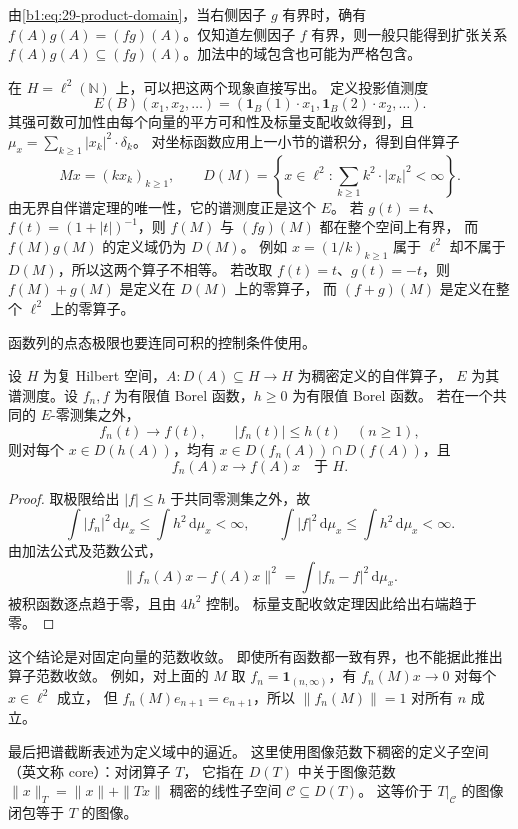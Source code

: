 由\eqref{b1:eq:29-product-domain}，当右侧因子 \(g\) 有界时，确有
\(f(A)g(A)=(fg)(A)\)。仅知道左侧因子 \(f\) 有界，则一般只能得到扩张关系
\(f(A)g(A)\subseteq(fg)(A)\)。加法中的域包含也可能为严格包含。

在 \(H=\ell^2(\mathbb N)\) 上，可以把这两个现象直接写出。
定义投影值测度
\[
 E(B)(x_1,x_2,\ldots)
 =(\mathbf1_B(1)\cdot x_1,\mathbf1_B(2)\cdot x_2,\ldots).
\]
其强可数可加性由每个向量的平方可和性及标量支配收敛得到，且
\(\mu_x=\sum_{k\ge1}|x_k|^2\cdot\delta_k\)。
对坐标函数应用上一小节的谱积分，得到自伴算子
\[
 Mx=(kx_k)_{k\ge1},\qquad
 D(M)=\left\{x\in\ell^2:\sum_{k\ge1}k^2\cdot|x_k|^2<\infty\right\}.
\]
由无界自伴谱定理的唯一性，它的谱测度正是这个 \(E\)。
若 \(g(t)=t\)、\(f(t)=(1+|t|)^{-1}\)，则 \(f(M)\) 与 \((fg)(M)\) 都在整个空间上有界，
而 \(f(M)g(M)\) 的定义域仍为 \(D(M)\)。
例如 \(x=(1/k)_{k\ge1}\) 属于 \(\ell^2\) 却不属于 \(D(M)\)，所以这两个算子不相等。
若改取 \(f(t)=t\)、\(g(t)=-t\)，则 \(f(M)+g(M)\) 是定义在 \(D(M)\) 上的零算子，
而 \((f+g)(M)\) 是定义在整个 \(\ell^2\) 上的零算子。

\ProseParagraphBreak

函数列的点态极限也要连同可积的控制条件使用。

\begin{proposition}[谱积分的支配收敛]
\label{b1:prop:29-unbounded-calculus-dominated}
设 \(H\) 为复 Hilbert 空间，\(A:D(A)\subseteq H\to H\) 为稠密定义的自伴算子，
\(E\) 为其谱测度。设 \(f_n,f\) 为有限值 Borel 函数，\(h\ge0\) 为有限值 Borel 函数。
若在一个共同的 \(E\)-零测集之外，
\[
 f_n(t)\longrightarrow f(t),\qquad |f_n(t)|\le h(t)\quad(n\ge1),
\]
则对每个 \(x\in D(h(A))\)，均有 \(x\in D(f_n(A))\cap D(f(A))\)，且
\[
 f_n(A)x\longrightarrow f(A)x\quad\text{于 }H.
\]
\end{proposition}
\begin{proof}
取极限给出 \(|f|\le h\) 于共同零测集之外，故
\[
 \int|f_n|^2\,\mathrm d\mu_x\le\int h^2\,\mathrm d\mu_x<\infty,
 \qquad
 \int|f|^2\,\mathrm d\mu_x\le\int h^2\,\mathrm d\mu_x<\infty.
\]
由加法公式及范数公式，
\[
 \|f_n(A)x-f(A)x\|^2
 =\int|f_n-f|^2\,\mathrm d\mu_x.
\]
被积函数逐点趋于零，且由 \(4h^2\) 控制。
标量支配收敛定理因此给出右端趋于零。
\end{proof}

这个结论是对固定向量的范数收敛。
即使所有函数都一致有界，也不能据此推出算子范数收敛。
例如，对上面的 \(M\) 取 \(f_n=\mathbf1_{(n,\infty)}\)，有 \(f_n(M)x\to0\) 对每个 \(x\in\ell^2\) 成立，
但 \(f_n(M)e_{n+1}=e_{n+1}\)，所以 \(\|f_n(M)\|=1\) 对所有 \(n\) 成立。

最后把谱截断表述为定义域中的逼近。
这里使用图像范数下稠密的定义子空间（英文称 core）：对闭算子 \(T\)，
它指在 \(D(T)\) 中关于图像范数 \(\|x\|_T=\|x\|+\|Tx\|\) 稠密的线性子空间
\(\mathcal C\subseteq D(T)\)。
这等价于 \(T|_{\mathcal C}\) 的图像闭包等于 \(T\) 的图像。


